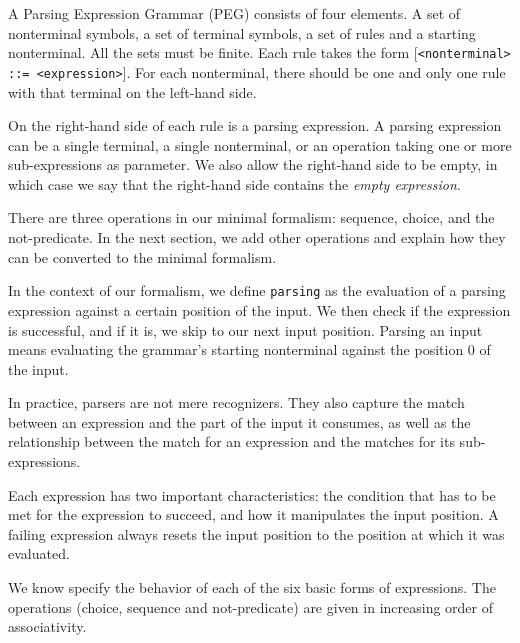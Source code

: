 A Parsing Expression Grammar (PEG) consists of four elements. A set of
nonterminal symbols, a set of terminal symbols, a set of rules and a starting
nonterminal. All the sets must be finite. Each rule takes the form
[\texttt{<nonterminal> ::= <expression>}]. For each nonterminal, there should be
one and only one rule with that terminal on the left-hand side.

On the right-hand side of each rule is a parsing expression. A parsing
expression can be a single terminal, a single nonterminal, or an operation
taking one or more sub-expressions as parameter. We also allow the right-hand
side to be empty, in which case we say that the right-hand side contains the
\emph{empty expression}.

There are three operations in our minimal formalism: sequence, choice, and the
not-predicate. In the next section, we add other operations and explain how they
can be converted to the minimal formalism.

In the context of our formalism, we define \texttt{parsing} as the evaluation of
a parsing expression against a certain position of the input. We then check if
the expression is successful, and if it is, we skip to our next input
position. Parsing an input means evaluating the grammar's starting nonterminal
against the position 0 of the input.

In practice, parsers are not mere recognizers. They also capture the match
between an expression and the part of the input it consumes, as well as the
relationship between the match for an expression and the matches for its
sub-expressions.

Each expression has two important characteristics: the condition that has to be
met for the expression to succeed, and how it manipulates the input position. A
failing expression always resets the input position to the position at which it
was evaluated.

We know specify the behavior of each of the six basic forms of expressions. The
operations (choice, sequence and not-predicate) are given in increasing order of
associativity.

